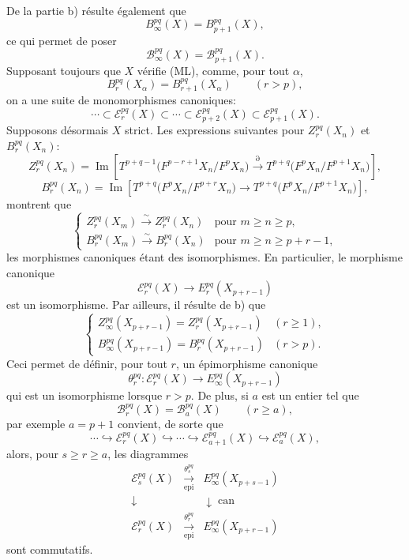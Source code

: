 \documentclass[11pt]{article}
\providecommand{\Im}{\operatorname{Im}}
\renewcommand{\Im}{\operatorname{Im}}
\providecommand{\Im}{\operatorname{Im}}
\providecommand{\can}{\operatorname{can}}
\providecommand{\epi}{\operatorname{epi}}
\begin{document}
De la partie b) résulte également que
\[
B_\infty^{pq}(X)=B_{p+1}^{pq}(X),
\]
ce qui permet de poser
\[
\mathcal B_\infty^{pq}(X)=\mathcal B_{p+1}^{pq}(X).
\]
Supposant toujours que \(X\) vérifie (ML), comme, pour tout \(\alpha\),
\[
B_r^{pq}(X_\alpha)=B_{r+1}^{pq}(X_\alpha)\qquad(r>p),
\]
on a une suite de monomorphismes canoniques:
\begin{equation}
\cdots\subset\mathcal E_r^{pq}(X)\subset\cdots\subset\mathcal E_{p+2}^{pq}(X)\subset\mathcal E_{p+1}^{pq}(X).
\tag{S}
\end{equation}
Supposons désormais \(X\) strict. Les expressions suivantes pour \(Z_r^{pq}(X_n)\) et \(B_r^{pq}(X_n)\):
\[
Z_r^{pq}(X_n)=
\Im\!\left[
T^{p+q-1}\bigl(F^{p-r+1}X_n/F^pX_n\bigr)
\xrightarrow{\partial}
T^{p+q}\bigl(F^pX_n/F^{p+1}X_n\bigr)
\right],
\]
\[
B_r^{pq}(X_n)=
\Im\!\left[
T^{p+q}\bigl(F^pX_n/F^{p+r}X_n\bigr)
\longrightarrow
T^{p+q}\bigl(F^pX_n/F^{p+1}X_n\bigr)
\right],
\]
montrent que
\begin{equation}
\left\{
\begin{array}{ll}
Z_r^{pq}(X_m)\xrightarrow{\sim}Z_r^{pq}(X_n)&\text{pour }m\ge n\ge p,\\[3pt]
B_r^{pq}(X_m)\xrightarrow{\sim}B_r^{pq}(X_n)&\text{pour }m\ge n\ge p+r-1,
\end{array}
\right.
\tag{\(d_1\)}
\end{equation}
les morphismes canoniques étant des isomorphismes. En particulier, le morphisme canonique
\[
\mathcal E_r^{pq}(X)\longrightarrow E_r^{pq}(X_{p+r-1})
\]
est un isomorphisme. Par ailleurs, il résulte de b) que
\begin{equation}
\left\{
\begin{array}{ll}
Z_\infty^{pq}(X_{p+r-1})=Z_r^{pq}(X_{p+r-1})&(r\ge1),\\[3pt]
B_\infty^{pq}(X_{p+r-1})=B_r^{pq}(X_{p+r-1})&(r>p).
\end{array}
\right.
\tag{\(d_2\)}
\end{equation}
Ceci permet de définir, pour tout \(r\), un épimorphisme canonique
\[
\theta_r^{pq}:\mathcal E_r^{pq}(X)\longrightarrow E_\infty^{pq}(X_{p+r-1})
\]
qui est un isomorphisme lorsque \(r>p\). De plus, si \(a\) est un entier tel que
\[
\mathcal B_r^{pq}(X)=\mathcal B_a^{pq}(X)\qquad(r\ge a),
\]
par exemple \(a=p+1\) convient, de sorte que
\begin{equation}
\cdots\hookrightarrow\mathcal E_r^{pq}(X)\hookrightarrow\cdots\hookrightarrow
\mathcal E_{a+1}^{pq}(X)\hookrightarrow\mathcal E_a^{pq}(X),
\tag{S bis}
\end{equation}
alors, pour \(s\ge r\ge a\), les diagrammes
\begin{equation}
\begin{array}{ccc}
\mathcal E_s^{pq}(X)&\xrightarrow[\epi]{\theta_s^{pq}}&E_\infty^{pq}(X_{p+s-1})\\
\downarrow&&\downarrow\can\\
\mathcal E_r^{pq}(X)&\xrightarrow[\epi]{\theta_r^{pq}}&E_\infty^{pq}(X_{p+r-1})
\end{array}
\tag{\(d_3\)}
\end{equation}
sont commutatifs.
\end{document}
